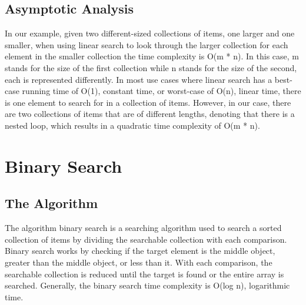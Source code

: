 \documentclass[letterpaper, 10pt,DIV=13]{scrartcl}
\numberwithin{equation}{section} %
\numberwithin{figure}{section} %
\numberwithin{table}{section} %
\begin{document}
\pagebreak

\subsection{Asymptotic Analysis}
In our example, given two different-sized collections of items, one larger and one smaller, when using linear search to look through the larger collection for each element in the smaller collection the time complexity is O(m * n). In this case, m stands for the size of the first collection while n stands for the size of the second, each is represented differently. In most use cases where linear search has a best-case running time of O(1), constant time, or worst-case of O(n), linear time, there is one element to search for in a collection of items. However, in our case, there are two collections of items that are of different lengths, denoting that there is a nested loop, which results in a quadratic time complexity of O(m * n).





\section{Binary Search}

\subsection{The Algorithm}
The algorithm binary search is a searching algorithm used to search a sorted collection of items by dividing the searchable collection with each comparison. Binary search works by checking if the target element is the middle object, greater than the middle object, or less than it. With each comparison, the searchable collection is reduced until the target is found or the entire array is searched. Generally, the binary search time complexity is O(log n), logarithmic time. 

\pagebreak
\end{document}
